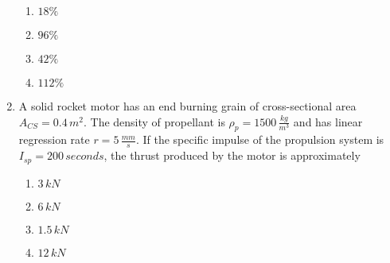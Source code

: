\documentclass[journal]{IEEEtran}
\begin{document}
\begin{enumerate}
    \begin{enumerate}
        \item $18\%$
        \item $96\%$
        \item $42\%$
        \item $112\%$
    \end{enumerate}
    \item A solid rocket motor has an end burning grain of cross-sectional area $A_{CS}=0.4\,m^2$. The density of propellant is $\rho_p=1500\,\frac{kg}{m^3}$ and has linear regression rate $r=5\,\frac{mm}{s}$. If the specific impulse of the propulsion system is $I_{sp}=200\,seconds$, the thrust  produced by the motor is approximately
    \begin{enumerate}
        \item $3\,kN$
        \item $6\,kN$
        \item $1.5\,kN$
        \item $12\,kN$
    \end{enumerate}
\end{enumerate}
\end{document}
